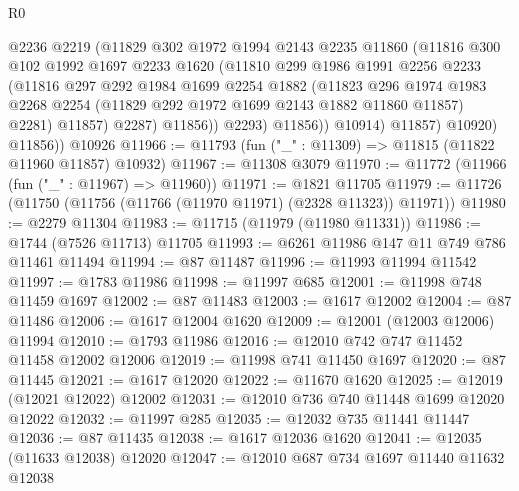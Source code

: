 \begin{lexlean}{R0}
\begin{coremodule}
                    @2236
                    @2219
                    (@11829
                      @302
                      @1972
                      @1994
                      @2143
                      @2235
                      @11860
                      (@11816
                        @300
                        @102
                        @1992
                        @1697
                        @2233
                        @1620
                        (@11810
                          @299
                          @1986
                          @1991
                          @2256
                          @2233
                          (@11816
                            @297
                            @292
                            @1984
                            @1699
                            @2254
                            @1882
                            (@11823
                              @296
                              @1974
                              @1983
                              @2268
                              @2254
                              (@11829 @292 @1972 @1699 @2143 @1882 @11860 @11857)
                              @2281)
                            @11857)
                          @2287)
                        @11856))
                    @2293)
                  @11856))
              @10914)
            @11857)
          @10920)
        @11856))
    @10926
@11966 := @11793 (fun ("_" : @11309) => @11815 (@11822 @11960 @11857) @10932)
@11967 := @11308 @3079
@11970 := @11772 (@11966 (fun ("_" : @11967) => @11960))
@11971 := @1821 @11705
@11979 := @11726 (@11750 (@11756 (@11766 (@11970 @11971) (@2328 @11323)) @11971))
@11980 := @2279 @11304
@11983 := @11715 (@11979 (@11980 @11331))
@11986 := @1744 (@7526 @11713) @11705
@11993 := @6261 @11986 @147 @11 @749 @786 @11461 @11494
@11994 := @87 @11487
@11996 := @11993 @11994 @11542
@11997 := @1783 @11986
@11998 := @11997 @685
@12001 := @11998 @748 @11459 @1697
@12002 := @87 @11483
@12003 := @1617 @12002
@12004 := @87 @11486
@12006 := @1617 @12004 @1620
@12009 := @12001 (@12003 @12006) @11994
@12010 := @1793 @11986
@12016 := @12010 @742 @747 @11452 @11458 @12002 @12006
@12019 := @11998 @741 @11450 @1697
@12020 := @87 @11445
@12021 := @1617 @12020
@12022 := @11670 @1620
@12025 := @12019 (@12021 @12022) @12002
@12031 := @12010 @736 @740 @11448 @1699 @12020 @12022
@12032 := @11997 @285
@12035 := @12032 @735 @11441 @11447
@12036 := @87 @11435
@12038 := @1617 @12036 @1620
@12041 := @12035 (@11633 @12038) @12020
@12047 := @12010 @687 @734 @1697 @11440 @11632 @12038

\end{coremodule}
\end{lexlean}
